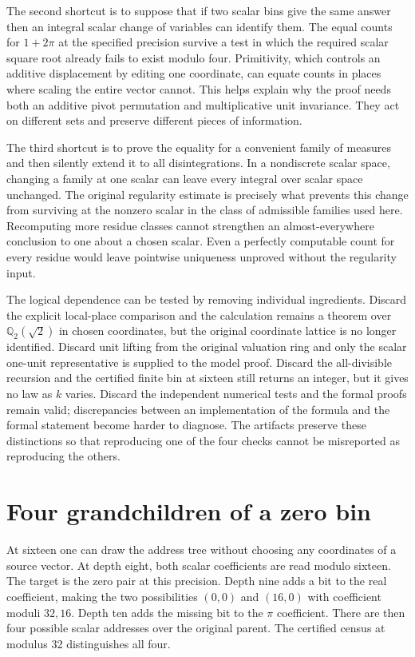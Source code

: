 \documentclass[12pt,letterpaper]{article}
\begin{document}
The second shortcut is to suppose that if two scalar bins give the same answer then an integral scalar change of variables can identify them. The equal counts for $1+2\pi$ at the specified precision survive a test in which the required scalar square root already fails to exist modulo four. Primitivity, which controls an additive displacement by editing one coordinate, can equate counts in places where scaling the entire vector cannot. This helps explain why the proof needs both an additive pivot permutation and multiplicative unit invariance. They act on different sets and preserve different pieces of information.

The third shortcut is to prove the equality for a convenient family of measures and then silently extend it to all disintegrations. In a nondiscrete scalar space, changing a family at one scalar can leave every integral over scalar space unchanged. The original regularity estimate is precisely what prevents this change from surviving at the nonzero scalar in the class of admissible families used here. Recomputing more residue classes cannot strengthen an almost-everywhere conclusion to one about a chosen scalar. Even a perfectly computable count for every residue would leave pointwise uniqueness unproved without the regularity input.

The logical dependence can be tested by removing individual ingredients. Discard the explicit local-place comparison and the calculation remains a theorem over $\mathbb Q_2(\sqrt2)$ in chosen coordinates, but the original coordinate lattice is no longer identified. Discard unit lifting from the original valuation ring and only the scalar one-unit representative is supplied to the model proof. Discard the all-divisible recursion and the certified finite bin at sixteen still returns an integer, but it gives no law as $k$ varies. Discard the independent numerical tests and the formal proofs remain valid; discrepancies between an implementation of the formula and the formal statement become harder to diagnose. The artifacts preserve these distinctions so that reproducing one of the four checks cannot be misreported as reproducing the others.
\section{Four grandchildren of a zero bin}
At sixteen one can draw the address tree without choosing any coordinates of a source vector. At depth eight, both scalar coefficients are read modulo sixteen. The target is the zero pair at this precision. Depth nine adds a bit to the real coefficient, making the two possibilities $(0,0)$ and $(16,0)$ with coefficient moduli $32,16$. Depth ten adds the missing bit to the $\pi$ coefficient. There are then four possible scalar addresses over the original parent. The certified census at modulus 32 distinguishes all four.
\end{document}
